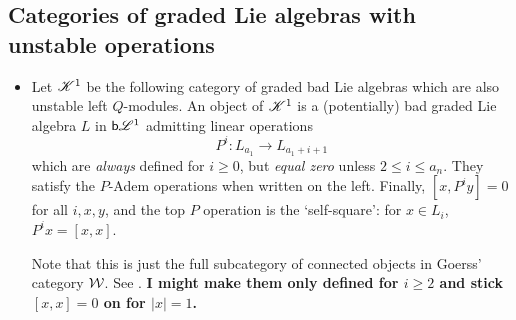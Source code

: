 \documentclass[11pt]{article}
\newcommand{\BadLie}[1]{\mathsf{b}{\scrL}^{#1}}%
\newcommand{\LL}[1]{{\scrK}^{#1}}%
\renewcommand{\Q}{Q}
\newcommand{\CommSteen}{\calA(\calC)}
\begin{document}
\begin{CategoriesOfInterest}
\subsection{Categories of graded Lie algebras with unstable operations}
\begin{itemize}
\setlength{\parindent}{.25in}
\item Let $\LL{1}$ be the following category of graded bad Lie algebras which are also unstable left $\Q$-modules.
An object of $\LL{1}$ is a (potentially) bad graded Lie algebra $L$ in $\BadLie{1}$ %
admitting linear operations
\[P^i:L_{a_1}\to L_{a_1+i+1}\]
which are \emph{always} defined for $i\geq0$, but \emph{equal zero} unless $2\leq i\leq a_n$. They satisfy the $P$-Adem operations when written on the left. Finally, $[x,P^iy]=0$ for all $i,x,y$, and the top $P$ operation is the `self-square': for $x\in L_{i}$, $P^{i}x=[x,x]$.

Note that this is just the full subcategory of connected objects in Goerss' category $\mathcal{W}$. See \cite[p.14]{MR1089001}. \textbf{I might make them only defined for $i\geq2$ and stick $[x,x]=0$ on for $|x|=1$.}


\end{itemize}
\end{CategoriesOfInterest}
\end{document}
